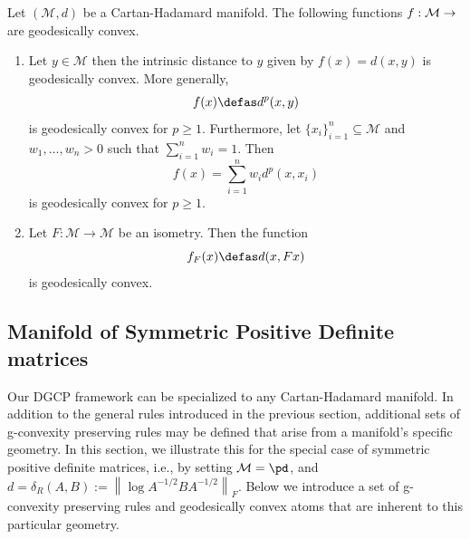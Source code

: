 \documentclass[twoside,11pt]{article}
\begin{document}
\begin{example}
    Let $(\mathcal{M}, d)$ be a Cartan-Hadamard manifold. The following functions $f: \mathcal{M} \to \real$ are geodesically convex.
    \begin{enumerate}
        \item Let $y \in \mathcal{M}$ then the intrinsic distance to $y$ given by $f(x) = d(x,y)$ is geodesically convex. More generally,  
        \[
        f(x) \defas d^p(x,y) 
        \]
        is geodesically convex for $p \geq 1.$ Furthermore, let $\{x_i\}_{i=1}^n \subseteq \mathcal{M}$ and $w_1, \ldots, w_n >0$ such that $\sum_{i=1}^n w_i  = 1$. Then 
        \begin{equation}
        f(x) = \sum_{i=1}^n w_i d^p(x, x_i)    
        \end{equation}
        is geodesically convex for $p \geq 1$.
        \item Let $F:\mathcal{M} \to \mathcal{M}$ be an isometry. Then the function 
        \[
        f_F(x) \defas d(x, Fx) 
        \]
        is geodesically convex.
        
    \end{enumerate}
\end{example}


\subsection{Manifold of Symmetric Positive Definite matrices}\label{sec:rules}

Our DGCP framework can be specialized to any Cartan-Hadamard manifold. In addition to the general rules introduced in the previous section, additional sets of g-convexity preserving rules may be defined that arise from a manifold's specific geometry. In this section, we illustrate this for the special case of symmetric positive definite matrices, i.e., by setting $\mathcal{M} = \pd$, and  $d = \delta_R(A, B):=\left\|\log A^{-1 / 2} B A^{-1 / 2}\right\|_F$. Below we introduce a set of g-convexity preserving rules and geodesically convex atoms that are inherent to this particular geometry.
\end{document}
